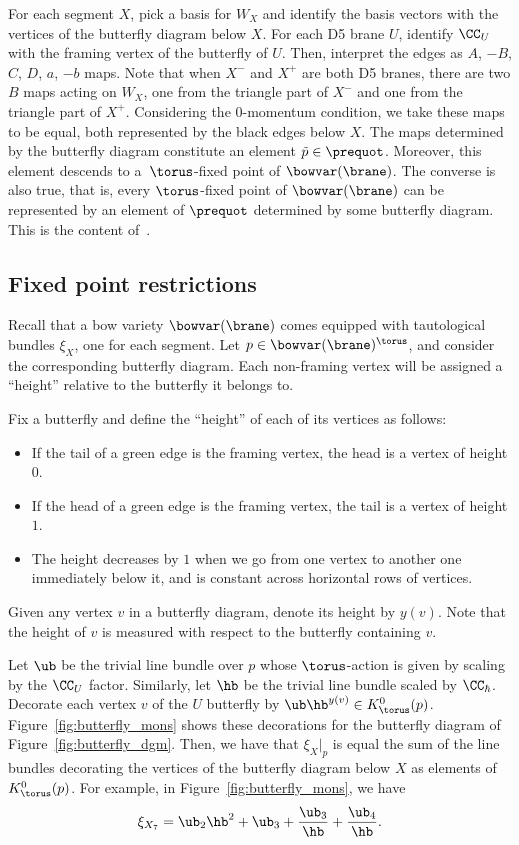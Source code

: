 For each segment $X$, pick a basis for $W_X$ and identify the basis vectors with the vertices of the butterfly diagram below $X$. For each D5 brane $U$, identify $\CC_U$ with the framing vertex of the butterfly of $U$. Then, interpret the edges as $A$, $-B$, $C$, $D$, $a$, $-b$ maps. Note that when $X^-$ and $X^+$ are both D5 branes, there are two $B$ maps acting on $W_X$, one from the triangle part of $X^-$ and one from the triangle part of $X^+$. Considering the $0$-momentum condition, we take these maps to be equal, both represented by the black edges below $X$. The maps determined by the butterfly diagram constitute an element $\tilde{p}\in\prequot$. Moreover, this element descends to a~$\torus$-fixed point of $\bowvar(\brane)$. The converse is also true, that is, every $\torus$-fixed point of $\bowvar(\brane)$ can be represented by an element of $\prequot$ determined by some butterfly diagram. This is the content of~\cite[Theorem~4.8]{RS}.

\subsection{Fixed point restrictions} \label{sec:fixed_res}
Recall that a bow variety $\bowvar(\brane)$ comes equipped with tautological bundles $\xi_X$, one for each segment. Let $p\in \bowvar(\brane)^\torus$, and consider the corresponding butterfly diagram. Each non-framing vertex will be assigned a ``height'' relative to the butterfly it belongs to.

\begin{Definition} \label{def:height}
Fix a butterfly and define the ``height'' of each of its vertices as follows:
\begin{itemize}\itemsep=0pt
\item If the tail of a green edge is the framing vertex, the head is a vertex of height $0$.
\item If the head of a green edge is the framing vertex, the tail is a vertex of height $1$.
\item The height decreases by $1$ when we go from one vertex to another one immediately below it, and is constant across horizontal rows of vertices.
\end{itemize}
Given any vertex $v$ in a butterfly diagram, denote its height by $y(v)$. Note that the height of $v$ is measured with respect to the butterfly containing $v$.
\end{Definition}

Let $\ub$ be the trivial line bundle over $p$ whose $\torus$-action is given by scaling by the $\CC_U$ factor. Similarly, let $\hb$ be the trivial line bundle scaled by $\CC_\hbar$. Decorate each vertex $v$ of the $U$ butterfly by $\ub \hb^{y(v)}\in K^0_\torus(p)$. Figure~\ref{fig:butterfly_mons} shows these decorations for the butterfly diagram of Figure~\ref{fig:butterfly_dgm}. Then, we have that $\xi_X|_p$ is equal the sum of the line bundles decorating the vertices of the butterfly diagram below $X$ as elements of $K^0_\torus(p)$. For example, in Figure~\ref{fig:butterfly_mons}, we have
\[
\xi_{X_7} = \ub_2\hb^2 + \ub_3 + \frac{\ub_3}{\hb} + \frac{\ub_4}{\hb}.
\]

